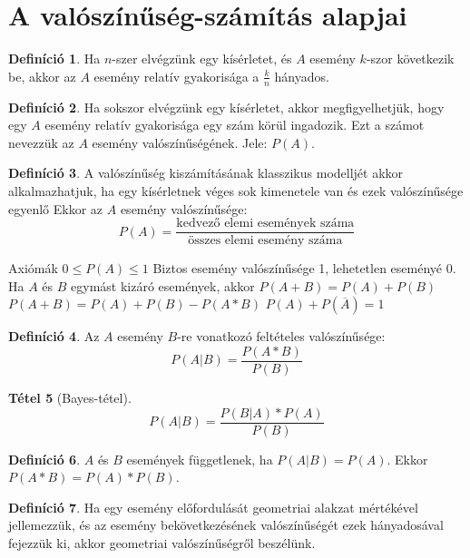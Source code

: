 \documentclass[twoside,12pt]{report}
\newtheorem{theorem}{Tétel}[section]
\theoremstyle{definition}
\newtheorem{definition}[theorem]{Definíció}
\begin{document}
\section{A valószínűség-számítás alapjai}
	\begin{definition}
		Ha $n$-szer elvégzünk egy kísérletet, és $A$ esemény $k$-szor következik be, akkor az $A$ esemény relatív gyakorisága a $\frac{k}{n}$ hányados.
	\end{definition}
	\begin{definition}
		Ha sokszor elvégzünk egy kísérletet, akkor megfigyelhetjük, hogy egy $A$ esemény
		relatív gyakorisága egy szám körül ingadozik. Ezt a számot nevezzük az $A$ esemény valószínűségének. Jele: $P(A)$.
	\end{definition}
	\begin{definition}
		A valószínűség kiszámításának klasszikus modelljét akkor alkalmazhatjuk, ha egy kísérletnek véges sok kimenetele van és ezek valószínűsége egyenlő Ekkor az $A$ esemény valószínűsége:
		\begin{equation*}
		P(A)=\frac{\text{kedvező elemi események száma}}{\text{összes elemi esemény száma}}
		\end{equation*}
	\end{definition}
	\begin{outline}
		\1 Axiómák
		\2 $0\le P(A)\le1$
		\2 Biztos esemény valószínűsége 1, lehetetlen eseményé 0.
		\2 Ha $A$ és $B$ egymást kizáró események, akkor $P(A+B)=P(A)+P(B)$
		\2 $P(A+B)=P(A)+P(B)-P(A*B)$
		\2 $P(A)+P(\overline{A})=1$
	\end{outline}
	\begin{definition}
		Az $A$ esemény $B$-re vonatkozó feltételes valószínűsége: \\
		\begin{equation*}
		P(A|B)=\frac{P(A*B)}{P(B)}
		\end{equation*}
	\end{definition}
	\begin{theorem}[Bayes-tétel]
		\begin{equation*}
		P(A|B)=\frac{P(B|A)*P(A)}{P(B)}
		\end{equation*}	
	\end{theorem}
	\begin{definition}
		$A$ és $B$ események függetlenek, ha $P(A|B)=P(A)$. Ekkor $P(A*B)=P(A)*P(B)$.
	\end{definition}
	\begin{definition}
		Ha egy esemény előfordulását geometriai alakzat mértékével jellemezzük, és az esemény bekövetkezésének valószínűségét ezek hányadosával fejezzük ki, akkor geometriai valószínűségről beszélünk.
	\end{definition}
\end{document}

